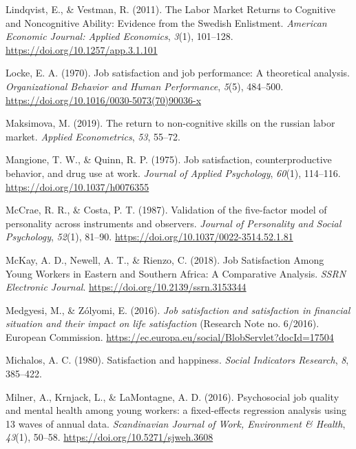 \documentclass[
]{interact}
\newlength{\cslhangindent}
\newenvironment{CSLReferences}[2] %
 {\begin{list}{}{%
  \setlength{\itemindent}{0pt}
  \setlength{\leftmargin}{0pt}
  \setlength{\parsep}{0pt}
  \ifodd #1
   \setlength{\leftmargin}{\cslhangindent}
   \setlength{\itemindent}{-1\cslhangindent}
  \fi
  \setlength{\itemsep}{#2\baselineskip}}}
 {\end{list}}
\begin{document}
\begin{CSLReferences}{1}{0}
Lindqvist, E., \& Vestman, R. (2011). The Labor Market Returns to
Cognitive and Noncognitive Ability: Evidence from the Swedish
Enlistment. \emph{American Economic Journal: Applied Economics},
\emph{3}(1), 101--128. \url{https://doi.org/10.1257/app.3.1.101}

Locke, E. A. (1970). Job satisfaction and job performance: A theoretical
analysis. \emph{Organizational Behavior and Human Performance},
\emph{5}(5), 484--500.
\url{https://doi.org/10.1016/0030-5073(70)90036-x}

Maksimova, M. (2019). The return to non-cognitive skills on the russian
labor market. \emph{Applied Econometrics}, \emph{53}, 55--72.

Mangione, T. W., \& Quinn, R. P. (1975). Job satisfaction,
counterproductive behavior, and drug use at work. \emph{Journal of
Applied Psychology}, \emph{60}(1), 114--116.
\url{https://doi.org/10.1037/h0076355}

McCrae, R. R., \& Costa, P. T. (1987). Validation of the five-factor
model of personality across instruments and observers. \emph{Journal of
Personality and Social Psychology}, \emph{52}(1), 81--90.
\url{https://doi.org/10.1037/0022-3514.52.1.81}

McKay, A. D., Newell, A. T., \& Rienzo, C. (2018). Job Satisfaction
Among Young Workers in Eastern and Southern Africa: A Comparative
Analysis. \emph{SSRN Electronic Journal}.
\url{https://doi.org/10.2139/ssrn.3153344}

Medgyesi, M., \& Zólyomi, E. (2016). \emph{Job satisfaction and
satisfaction in financial situation and their impact on life
satisfaction} (Research Note no. 6/2016). European Commission.
\url{https://ec.europa.eu/social/BlobServlet?docId=17504}

Michalos, A. C. (1980). Satisfaction and happiness. \emph{Social
Indicators Research}, \emph{8}, 385--422.

Milner, A., Krnjack, L., \& LaMontagne, A. D. (2016). Psychosocial job
quality and mental health among young workers: a fixed-effects
regression analysis using 13 waves of annual data. \emph{Scandinavian
Journal of Work, Environment \& Health}, \emph{43}(1), 50--58.
\url{https://doi.org/10.5271/sjweh.3608}


\end{CSLReferences}
\end{document}
